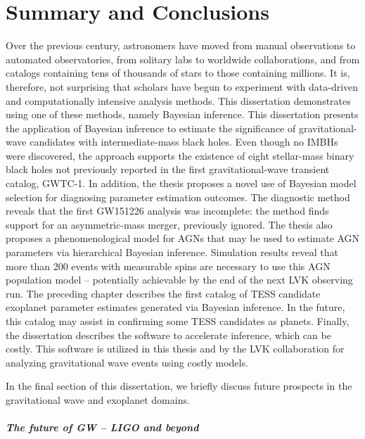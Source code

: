 \chapter{Summary and Conclusions}
\label{cp.conc}

Over the previous century, astronomers have moved from manual observations to automated observatories, from solitary labs to worldwide collaborations, and from catalogs containing tens of thousands of stars to those containing millions. 
It is, therefore, not surprising that scholars have begun to experiment with data-driven and computationally intensive analysis methods. This dissertation demonstrates using one of these methods, namely Bayesian inference. 
This dissertation presents the application of Bayesian inference to estimate the significance of gravitational-wave candidates with intermediate-mass black holes. 
Even though no IMBHs were discovered, the approach supports the existence of eight stellar-mass binary black holes not previously reported in the first gravitational-wave transient catalog, GWTC-1. 
In addition, the thesis proposes a novel use of Bayesian model selection for diagnosing parameter estimation outcomes. 
The diagnostic method reveals that the first GW151226 analysis was incomplete: the method finds support for an asymmetric-mass merger, previously ignored. 
The thesis also proposes a phenomenological model for AGNs that may be used to estimate AGN parameters via hierarchical Bayesian inference. 
Simulation results reveal that more than 200 events with measurable spins are necessary to use this AGN population model -- potentially achievable by the end of the next LVK observing run. 
The preceding chapter describes the first catalog of TESS candidate exoplanet parameter estimates generated via Bayesian inference. 
In the future, this catalog may assist in confirming some TESS candidates as planets. 
Finally, the dissertation describes the software to accelerate inference, which can be costly. 
This software is utilized in this thesis and by the LVK collaboration for analyzing gravitational wave events using costly models.

In the final section of this dissertation, we briefly discuss future prospects in the gravitational wave and exoplanet domains. 

\paragraph{The future of GW -- LIGO and beyond}

